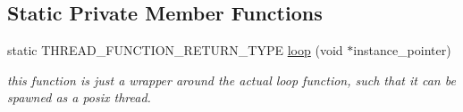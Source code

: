 \subsection*{Static Private Member Functions}
\begin{DoxyCompactItemize}
\item 
static T\+H\+R\+E\+A\+D\+\_\+\+F\+U\+N\+C\+T\+I\+O\+N\+\_\+\+R\+E\+T\+U\+R\+N\+\_\+\+T\+Y\+PE \hyperlink{classblmc__drivers_1_1SineTorqueControl_a6882e509d6e81f09a70aa4214aeadf16}{loop} (void $\ast$instance\+\_\+pointer)\hypertarget{classblmc__drivers_1_1SineTorqueControl_a6882e509d6e81f09a70aa4214aeadf16}{}\label{classblmc__drivers_1_1SineTorqueControl_a6882e509d6e81f09a70aa4214aeadf16}

\begin{DoxyCompactList}\small\item\em this function is just a wrapper around the actual loop function, such that it can be spawned as a posix thread. \end{DoxyCompactList}\end{DoxyCompactItemize}
